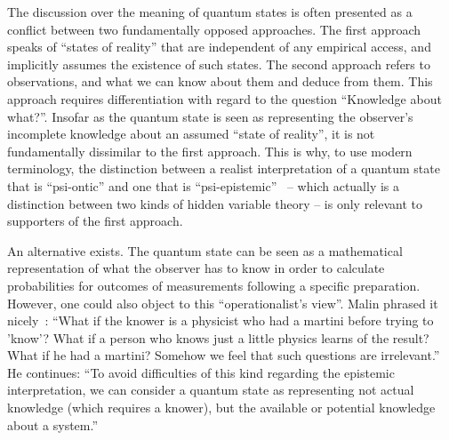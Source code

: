 \documentclass[12pt]{article}
\begin{document}
The discussion over the meaning of quantum states is often presented as a conflict between two fundamentally opposed approaches. The first approach speaks of ``states of reality'' that are independent of any empirical access, and implicitly assumes the existence of such states. The second approach refers to observations, and what we can know about them and deduce from them. This approach requires differentiation with regard to the question ``Knowledge about what?''. Insofar as the quantum state is seen as representing the observer's incomplete knowledge about an assumed ``state of reality'', it is not fundamentally dissimilar to the first approach. This is why, to use modern terminology, the distinction between a realist interpretation of a quantum state that is ``psi-ontic'' and one that is ``psi-epistemic''~\cite{spekkens} -- which actually is a distinction between two kinds of hidden variable theory -- is only relevant to supporters of the first approach. 

An alternative exists. The quantum state can be seen as a mathematical representation of what the observer has to know in order to calculate probabilities for outcomes of measurements following a specific preparation. However, one could also object to this ``operationalist's view''. Malin phrased it nicely~\cite{malin}: ``What if the knower is a physicist who had a martini before trying to 'know'? What if a person who knows just a little physics learns of the result? What if he had a martini? Somehow we feel that such questions are irrelevant.'' He continues: ``To avoid difficulties of this kind regarding the epistemic interpretation, we can consider a quantum state as representing not actual knowledge (which requires a knower), but the available or potential knowledge about a system.''  
\end{document}
